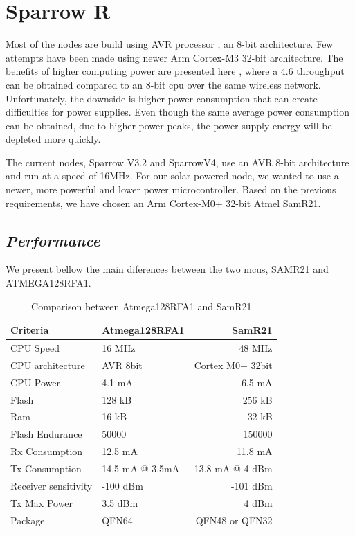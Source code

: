 \normalfont\normalsize
\chapter{Sparrow R}

Most of the nodes are build using AVR processor \cite{nodelist}, an 8-bit architecture. Few attempts have been made
using newer Arm Cortex-M3 32-bit architecture. The benefits of higher computing power are presented here
\cite{jurdak2011opal}, where a 4.6 throughput can be obtained compared to an 8-bit cpu over the
same wireless network. Unfortunately, the downside is higher power consumption that can create
difficulties for power supplies. Even though the same average power consumption can be obtained, due
to higher power peaks, the power supply energy will be depleted more quickly.

The current nodes, Sparrow V3.2 and SparrowV4, use an AVR 8-bit architecture and run at a speed of
16MHz. For our solar powered node, we wanted to use a newer, more powerful and lower power
microcontroller. Based on the previous requirements, we have chosen an Arm Cortex-M0+ 32-bit Atmel SamR21.


\section{\textit{Performance}}

We present bellow the main diferences between the two mcus, SAMR21 and ATMEGA128RFA1\cite{atmegafa}.

\begin{table} \centering
\begin{tabular}{llr}
\hline
Criteria    & Atmega128RFA1 & SamR21 \\
\hline
CPU Speed      & 16 MHz    & 48 MHz      \\
CPU architecture      & AVR 8bit    & Cortex M0+ 32bit      \\
CPU Power          & 4.1 mA       & 6.5 mA       \\
Flash           & 128 kB        & 256 kB        \\
Ram                 & 16 kB     & 32 kB         \\
Flash Endurance     &  50000    & 150000        \\
Rx Consumption       & 12.5 mA     & 11.8 mA     \\
Tx Consumption       & 14.5 mA @ 3.5mA     & 13.8 mA @ 4 dBm      \\
Receiver sensitivity & -100 dBm      & -101 dBm       \\
Tx Max Power & 3.5 dBm      & 4 dBm       \\
Package & QFN64      & QFN48 or QFN32      \\
\hline
\end{tabular}
\caption{Comparison between Atmega128RFA1 and SamR21}
\end{table}

